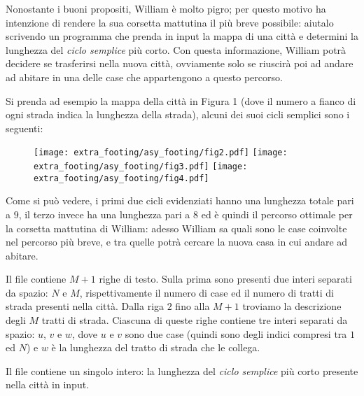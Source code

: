 	Nonostante i buoni propositi, William è molto pigro; per questo motivo ha intenzione di rendere la sua corsetta mattutina il più breve possibile: aiutalo  scrivendo un programma che prenda in input la mappa di una città e determini la lunghezza del \emph{ciclo semplice} più corto. Con questa informazione, William potrà decidere se trasferirsi nella nuova città, ovviamente solo se riuscirà poi ad andare ad abitare in una delle case  che appartengono a questo percorso.


	Si prenda ad esempio la mappa della città in Figura 1 (dove il numero a fianco di ogni strada indica la lunghezza della strada), alcuni dei suoi cicli semplici sono i seguenti:

	\begin{figure}[h!]
	  \centering
	  \texttt{[image: extra\_footing/asy\_footing/fig2.pdf]}\hfill
	  \texttt{[image: extra\_footing/asy\_footing/fig3.pdf]}\hfill
	  \texttt{[image: extra\_footing/asy\_footing/fig4.pdf]}
	\end{figure}


	Come si può vedere, i primi due cicli evidenziati hanno una lunghezza totale pari a $9$, il terzo invece ha una lunghezza pari a $8$ ed è quindi il percorso ottimale per la corsetta mattutina di William: adesso William sa quali sono le case coinvolte nel percorso più breve, e tra quelle potrà cercare la nuova casa in cui andare ad abitare.


	\InputFile
	Il file  contiene $M+1$ righe di testo. Sulla prima sono presenti due interi separati da spazio: $N$ e $M$, rispettivamente il numero di case ed il numero di tratti di strada presenti nella città. Dalla riga $2$ fino alla $M+1$ troviamo la descrizione degli $M$ tratti di strada. Ciascuna di queste righe contiene tre interi separati da spazio: $u$, $v$ e $w$, dove $u$ e $v$ sono due case (quindi sono degli indici compresi tra $1$ ed $N$) e $w$ è la lunghezza del tratto di strada che le collega.


	\OutputFile
	Il file \outputfile{} contiene un singolo intero: la lunghezza del \emph{ciclo semplice} più corto presente nella città in input.



